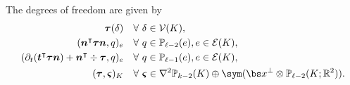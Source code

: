 The degrees of freedom are given by
\begin{align}
\boldsymbol \tau (\delta) & \quad\forall~\delta\in \mathcal V(K), \label{Hdivdivfemdof1}\\
(\boldsymbol  n^{\intercal}\boldsymbol \tau\boldsymbol  n, q)_e & \quad\forall~q\in\mathbb P_{\ell-2}(e),  e\in\mathcal E(K),\label{Hdivdivfemdof2}\\
(\partial_{t}(\boldsymbol  t^{\intercal}\boldsymbol \tau\boldsymbol  n)+\boldsymbol  n^{\intercal}\div\boldsymbol \tau, q)_e & \quad\forall~q\in\mathbb P_{\ell-1}(e),  e\in\mathcal E(K),\label{Hdivdivfemdof3}\\
(\boldsymbol \tau, \boldsymbol \varsigma)_K & \quad\forall~\boldsymbol \varsigma\in\nabla^2\mathbb P_{k-2}(K)\oplus \sym (\bs x^{\perp}\otimes \mathbb P_{\ell-2}(K;\mathbb R^2)). \label{Hdivdivfemdof4}
\end{align}

